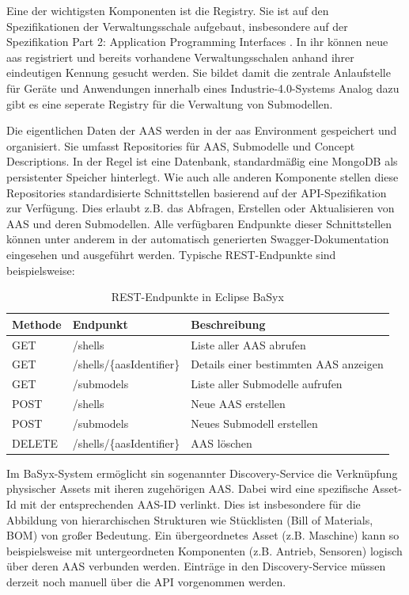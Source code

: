 Eine der wichtigsten Komponenten ist die Registry. 
Sie ist auf den Spezifikationen der Verwaltungsschale aufgebaut, insbesondere auf der Spezifikation Part 2: Application Programming Interfaces \cite{SpezifikationPart2}.
In ihr können neue \acs{aas} registriert und bereits vorhandene Verwaltungsschalen anhand ihrer eindeutigen Kennung gesucht werden.
Sie bildet damit die zentrale Anlaufstelle für Geräte und Anwendungen innerhalb eines Industrie-4.0-Systems
Analog dazu gibt es eine seperate Registry für die Verwaltung von Submodellen.

Die eigentlichen Daten der AAS werden in der \acs{aas} Environment gespeichert und organisiert.
Sie umfasst Repositories für AAS, Submodelle und Concept Descriptions.
In der Regel ist eine Datenbank, standardmäßig eine MongoDB als persistenter Speicher hinterlegt.
Wie auch alle anderen Komponente stellen diese Repositories standardisierte Schnittstellen basierend auf der API-Spezifikation zur Verfügung.
Dies erlaubt z.B. das Abfragen, Erstellen oder Aktualisieren von AAS und deren Submodellen.
Alle verfügbaren Endpunkte dieser Schnittstellen können unter anderem in der automatisch generierten Swagger-Dokumentation eingesehen und ausgeführt werden. 
Typische REST-Endpunkte sind beispielsweise:

\vspace{1em}
\begin{table}[htbp]
    \centering
    \begin{tabular}{l l l}
        \toprule
        \textbf{Methode} & \textbf{Endpunkt} & \textbf{Beschreibung} \\
        \toprule
        GET     & /shells & Liste aller AAS abrufen \\
        GET     & /shells/\{aasIdentifier\} & Details einer bestimmten AAS anzeigen \\
        GET     & /submodels & Liste aller Submodelle aufrufen \\
        POST    & /shells & Neue AAS erstellen \\
        POST    & /submodels & Neues Submodell erstellen \\
        DELETE  & /shells/\{aasIdentifier\} & AAS löschen \\
        \midrule
    \end{tabular}
    \caption{REST-Endpunkte in Eclipse BaSyx}
    \label{tab:aas_endpoints}
\end{table}

Im BaSyx-System ermöglicht sin sogenannter Discovery-Service die Verknüpfung physischer Assets mit iheren zugehörigen AAS.
Dabei wird eine spezifische Asset-Id mit der entsprechenden AAS-ID verlinkt.
Dies ist insbesondere für die Abbildung von hierarchischen Strukturen wie Stücklisten (Bill of Materials, BOM) von großer Bedeutung.
Ein übergeordnetes Asset (z.B. Maschine) kann so beispielsweise mit untergeordneten Komponenten (z.B. Antrieb, Sensoren) logisch über deren AAS verbunden werden.
Einträge in den Discovery-Service müssen derzeit noch manuell über die API vorgenommen werden.

